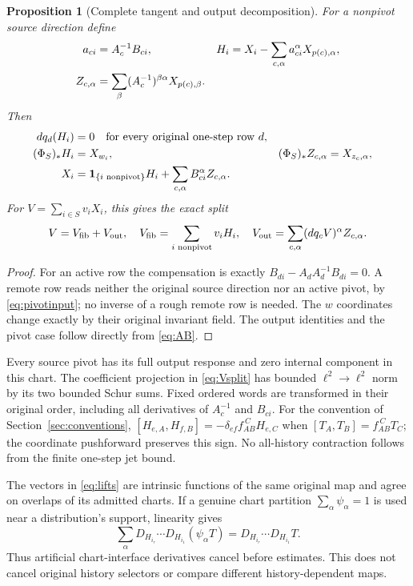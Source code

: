 \documentclass[11pt,letterpaper]{article}
\theoremstyle{plain}
\newtheorem{proposition}[theorem]{Proposition}
\theoremstyle{remark}\newtheorem{remark}[theorem]{Scope}
\newcommand{\ind}{\mathbf1}
\begin{document}
\begin{proposition}[Complete tangent and output decomposition]
\label{prop:lifts}
For a nonpivot source direction define
\begin{align}
a_{ci}&=A_c^{-1}B_{ci},
&H_i&=X_i-\sum_{c,\alpha}a_{ci}^\alpha X_{p(c),\alpha},\notag\\
Z_{c,\alpha}&=\sum_\beta(A_c^{-1})^{\beta\alpha}X_{p(c),\beta}.
\label{eq:lifts}
\end{align}
Then
\begin{align}
dq_d(H_i)&=0\quad\hbox{for every original one-step row }d,\notag\\
(\Phi_S)_*H_i&=X_{w_i},
&(\Phi_S)_*Z_{c,\alpha}&=X_{z_c,\alpha},\notag\\
X_i&=\ind_{\{i\text{ nonpivot}\}}H_i
+\sum_{c,\alpha}B_{ci}^\alpha Z_{c,\alpha}.
\label{eq:complete-lift}
\end{align}
For $V=\sum_{i\in S}v_iX_i$, this gives the exact split
\begin{equation}
V=V_{\rm fib}+V_{\rm out},\quad
V_{\rm fib}=\sum_{i\text{ nonpivot}}v_iH_i,\quad
V_{\rm out}=\sum_{c,\alpha}(dq_cV)^\alpha Z_{c,\alpha}.
\label{eq:Vsplit}
\end{equation}
\end{proposition}
\begin{proof}
For an active row the compensation is exactly $B_{di}-A_dA_d^{-1}B_{di}=0$.
A remote row reads neither the original source direction nor an active pivot,
by \eqref{eq:pivotinput}; no inverse of a rough remote row is needed. The $w$
coordinates change exactly by their original invariant field. The output
identities and the pivot case follow directly from \eqref{eq:AB}.
\end{proof}

Every source pivot has its full output response and zero internal component in
this chart. The coefficient projection in \eqref{eq:Vsplit} has bounded
$\ell^2\to\ell^2$ norm by its two bounded Schur sums. Fixed ordered words are
transformed in their original order, including all derivatives of $A_c^{-1}$ and
$B_{ci}$. For the convention of Section~\ref{sec:conventions},
$[H_{e,A},H_{f,B}]=-\delta_{ef}f_{AB}^{\ C}H_{e,C}$ when
$[T_A,T_B]=f_{AB}^{\ C}T_C$; the coordinate pushforward preserves this sign.
No all-history contraction follows from the finite one-step jet bound.

The vectors in \eqref{eq:lifts} are intrinsic functions of the same original map
and agree on overlaps of its admitted charts. If a genuine chart partition
$\sum_\alpha\psi_\alpha=1$ is used near a distribution's support, linearity gives
\begin{equation}
\sum_\alpha D_{H_{i_r}}\cdots D_{H_{i_1}}(\psi_\alpha T)
=D_{H_{i_r}}\cdots D_{H_{i_1}}T.
\label{eq:chartglue}
\end{equation}
Thus artificial chart-interface derivatives cancel before estimates. This does
not cancel original history selectors or compare different history-dependent maps.
\end{document}
